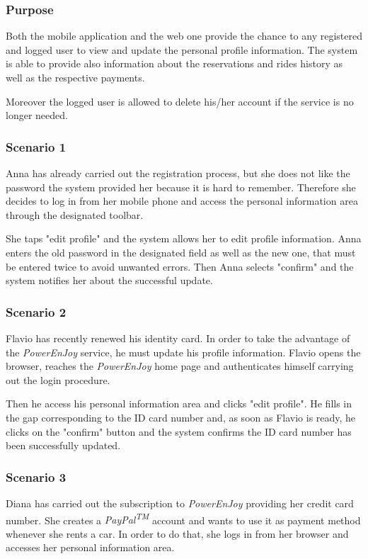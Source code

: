 \subsubsection{Purpose}
Both the mobile application and the web one provide the chance to any registered and logged user to view and update the personal profile information. The system is able to provide also information about the reservations and rides history as well as the respective payments.

Moreover the logged user is allowed to delete his/her account if the service is no longer needed.

\subsubsection{Scenario 1}
Anna has already carried out the registration process, but she does not like the password the system provided her because it is hard to remember. Therefore she decides to log in from her mobile phone and access the personal information area through the designated toolbar.

She taps "edit profile" and the system allows her to edit profile information. Anna enters the old password in the designated field as well as the new one, that must be entered twice to avoid unwanted errors. Then Anna selects "confirm" and the system notifies her about the successful update.

\subsubsection{Scenario 2}
Flavio has recently renewed his identity card. In order to take the advantage of the \emph{PowerEnJoy} service, he must update his profile information. Flavio opens the browser, reaches the \emph{PowerEnJoy} home page and authenticates himself carrying out the login procedure. 

Then he access his personal information area and clicks "edit profile". He fills in the gap corresponding to the ID card number and, as soon as Flavio is ready, he clicks on the "confirm" button and the system confirms the ID card number has been successfully updated.

\subsubsection{Scenario 3}
Diana has carried out the subscription to \emph{PowerEnJoy} providing her credit card number. She creates a \emph{PayPal\textsuperscript{TM}} account and wants to use it as payment method whenever she rents a car. In order to do that, she logs in from her browser and accesses her personal information area.

